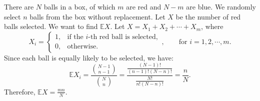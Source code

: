 \documentclass{huhtakm-template-book-v2}
\newcommand{\expect}{\mathbb{E}}
\begin{document}
    \begin{eg}
        There are $N$ balls in a box, of which $m$ are red and $N-m$ are blue. We randomly select $n$ balls from the box without replacement. Let $X$ be the number of red balls selected. We want to find $\expect{X}$. Let $X = X_{1} + X_{2} + \cdots + X_{m}$, where
        \begin{equation*}
            X_{i} = \begin{cases}
                1, &\text{if the $i$-th red ball is selected},\\
                0, &\text{otherwise}.
            \end{cases}, \qquad\text{for } i = 1, 2, \cdots, m.
        \end{equation*}
        Since each ball is equally likely to be selected, we have:
        \begin{equation*}
            \expect{X_{i}} = \frac{\binom{N-1}{n-1}}{\binom{N}{n}} = \frac{\frac{(N-1)!}{(n-1)!(N-n)!}}{\frac{N!}{n!(N-n)!}} = \frac{n}{N}.
        \end{equation*}
        Therefore, $\expect{X} = \frac{mn}{N}$.
    \end{eg}
    \newpage
\end{document}
